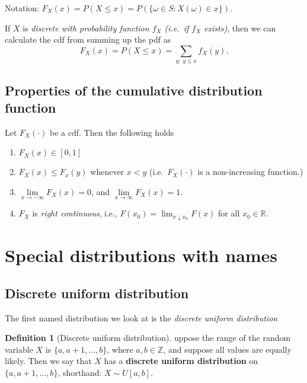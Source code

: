 \documentclass[
]{book}
\theoremstyle{definition}
\newtheorem{definition}{Definition}[chapter]
\theoremstyle{definition}
\theoremstyle{definition}
\theoremstyle{definition}
\theoremstyle{remark}
\begin{document}
Notation: \(F_X(x) = P(X\le x) = P(\{\omega \in S : X(\omega)\in x\}).\)

If \(X\) is \emph{discrete with probability function \(f_X\) (i.e.~if \(f_X\) exists)}, then we can calculate the cdf from summing up the pdf as
\[
F_X(x)=P( X \le x ) = \sum_{y:\; y\le x}f_X(y).
\]

\subsection{Properties of the cumulative distribution function}\label{properties-of-the-cumulative-distribution-function}

Let \(F_X(\cdot)\) be a cdf. Then the following holds

\begin{enumerate}
\def\labelenumi{\arabic{enumi}.}
\item
  \(F_X(x)\in [0,1]\)
\item
  \(F_X(x) \le F_x(y)\) whenever \(x<y\) (i.e.~\(F_X(\cdot)\) is a non-increasing function.)
\item
  \(\lim\limits_{x \to - \infty } F_X(x)=0\), and \(\lim\limits_{x \to \infty } F_X(x)  = 1\).
\item
  \(F_X\) is \emph{right continuous}, i.e., \(F(x_0)=\lim_{x\downarrow x_0} F(x)\) for all \(x_0\in\mathbb{R}\).
\end{enumerate}

\section{Special distributions with names}\label{special-distributions-with-names}

\subsection{Discrete uniform distribution}\label{discrete-uniform-distribution}

The first named distribution we look at is the \emph{discrete uniform distribution}

\begin{definition}[Discrete uniform distribution]
uppose the range of the random variable \(X\) is \(\{a,a+1,\dots, b\}\), where \(a,b\in\mathbb{Z}\), and suppose all values are equally likely. Then we say that \(X\) has a \textbf{discrete uniform distribution} on \(\{a,a+1,\dots,b\}\), shorthand: \(X \sim U[a,b]\).
\end{definition}
\end{document}
